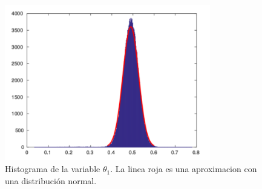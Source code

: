 \begin{figure}[H]
\begin{minipage}{1.0\textwidth}
 \centering
	\includegraphics[width=0.8\textwidth]{imgs/theta1.pdf}
	\caption{\footnotesize Histograma de la variable $\theta_1$. La linea roja es una aproximacion con una distribución normal.}
\end{minipage}
\end{figure}

